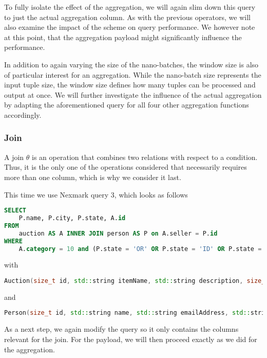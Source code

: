 To fully isolate the effect of the aggregation, we will again slim down this query to just the actual aggregation column.
As with the previous operators, we will also examine the impact of the scheme on query performance.
We however note at this point, that the aggregation payload might significantly influence the performance.

In addition to again varying the size of the nano-batches, the window size is also of particular interest for an aggregation.
While the nano-batch size represents the input tuple size, the window size defines how many tuples can be processed and output at once. 
We will further investigate the influence of the actual aggregation by adapting the aforementioned query for all four other aggregation functions accordingly. 

\subsubsection{Join}

A join $\theta$ is an operation that combines two relations with respect to a condition.
Thus, it is the only one of the operations considered that necessarily requires more than one column, which is why we consider it last.

This time we use Nexmark query 3, which looks as follows

\begin{lstlisting}[language=SQL]
SELECT
    P.name, P.city, P.state, A.id
FROM
    auction AS A INNER JOIN person AS P on A.seller = P.id
WHERE
    A.category = 10 and (P.state = 'OR' OR P.state = 'ID' OR P.state = 'CA');
\end{lstlisting}

with

\begin{lstlisting}[language=c++]
Auction(size_t id, std::string itemName, std::string description, size_t initialId, size_t reserve, time_t dateTime, time_t expires, size_t seller, size_t category, std::string extra);
\end{lstlisting}

and

\begin{lstlisting}[language=c++]
Person(size_t id, std::string name, std::string emailAddress, std::string creditCard, std::string city, std::string state, time_t dateTime, std::string extra);
\end{lstlisting}

As a next step, we again modify the query so it only contains the columns relevant for the join.
For the payload, we will then proceed exactly as we did for the aggregation.

